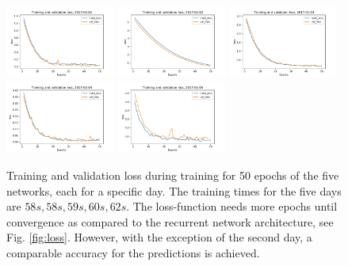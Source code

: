 \documentclass[
a4paper,     %
12pt           %
]{scrartcl}  %
\numberwithin{equation}{section}
\begin{document}
\begin{figure}
	\centering
	\includegraphics[width=0.32\textwidth]{fig/loss2017-01-01_tnn_seed1.pdf}
	\includegraphics[width=0.32\textwidth]{fig/loss2017-01-02_tnn_seed1.pdf}
	\includegraphics[width=0.32\textwidth]{fig/loss2017-01-03_tnn_seed1.pdf}
	\includegraphics[width=0.32\textwidth]{fig/loss2017-01-04_tnn_seed1.pdf}
	\includegraphics[width=0.32\textwidth]{fig/loss2017-01-05_tnn_seed1.pdf}
	\caption{Training and validation loss during training for 50 epochs of the five networks, each for a specific day. The training times for the five days are $58s, 58s, 59s, 60s, 62s$. The loss-function needs more epochs until convergence as compared to the recurrent network architecture, see Fig. \ref{fig:loss}. However, with the exception of the second day, a comparable accuracy for the predictions is achieved.}
	\label{fig:alternative_loss}
\end{figure}
\end{document}
